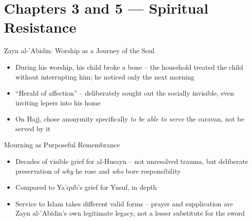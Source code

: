 \section{Chapters 3 and 5 — Spiritual Resistance}


\begin{frame}{Zayn al-'Abidin: Worship as a Journey of the Soul}
\begin{itemize}[itemsep=5pt]
  \item During his worship, his child broke a bone -- the household treated the child without interrupting him; he noticed only the next morning
  \item ``Herald of affection'' -- deliberately sought out the socially invisible, even inviting lepers into his home
  \item On Hajj, chose anonymity specifically \emph{to be able to serve} the caravan, not be served by it
\end{itemize}
\end{frame}

\begin{frame}{Mourning as Purposeful Remembrance}
\begin{itemize}[itemsep=5pt]
  \item Decades of visible grief for al-Husayn -- not unresolved trauma, but deliberate preservation of \emph{why} he rose and \emph{who} bore responsibility
  \item Compared to Ya'qub's grief for Yusuf, in depth
  \item Service to Islam takes different valid forms -- prayer and supplication are Zayn al-'Abidin's own legitimate legacy, not a lesser substitute for the sword
\end{itemize}
\end{frame}


